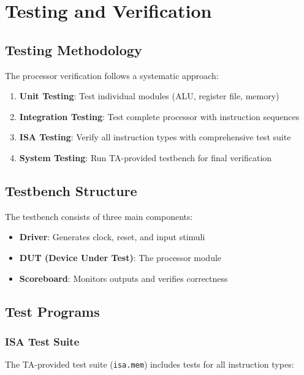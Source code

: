 \chapter{Testing and Verification}

\section{Testing Methodology}

The processor verification follows a systematic approach:

\begin{enumerate}
    \item \textbf{Unit Testing}: Test individual modules (ALU, register file, memory)
    \item \textbf{Integration Testing}: Test complete processor with instruction sequences
    \item \textbf{ISA Testing}: Verify all instruction types with comprehensive test suite
    \item \textbf{System Testing}: Run TA-provided testbench for final verification
\end{enumerate}

\section{Testbench Structure}

The testbench consists of three main components:

\begin{itemize}
    \item \textbf{Driver}: Generates clock, reset, and input stimuli
    \item \textbf{DUT (Device Under Test)}: The processor module
    \item \textbf{Scoreboard}: Monitors outputs and verifies correctness
\end{itemize}

\section{Test Programs}

\subsection{ISA Test Suite}

The TA-provided test suite (\texttt{isa.mem}) includes tests for all instruction types:

